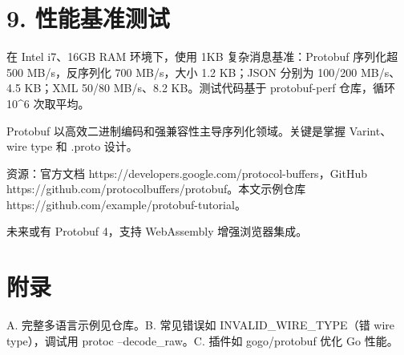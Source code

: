 \chapter{9. 性能基准测试}
在 Intel i7、16GB RAM 环境下，使用 1KB 复杂消息基准：Protobuf 序列化超 500 MB/s，反序列化 700 MB/s，大小 1.2 KB；JSON 分别为 100/200 MB/s、4.5 KB；XML 50/80 MB/s、8.2 KB。测试代码基于 protobuf-perf 仓库，循环 10\^{}6 次取平均。\par
Protobuf 以高效二进制编码和强兼容性主导序列化领域。关键是掌握 Varint、wire type 和 .proto 设计。\par
资源：官方文档 https://developers.google.com/protocol-buffers，GitHub https://github.com/protocolbuffers/protobuf。本文示例仓库 https://github.com/example/protobuf-tutorial。\par
未来或有 Protobuf 4，支持 WebAssembly 增强浏览器集成。\par
\chapter{附录}
A. 完整多语言示例见仓库。B. 常见错误如 INVALID\_{}WIRE\_{}TYPE（错 wire type），调试用 protoc --decode\_{}raw。C. 插件如 gogo/protobuf 优化 Go 性能。\par
